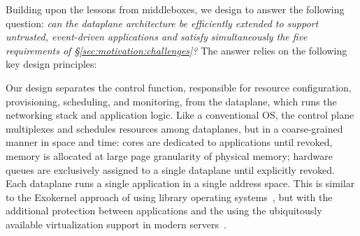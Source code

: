 
Building upon the lessons from middleboxes, we design \ix to answer
the following question: {\it can the dataplane architecture be
  efficiently extended to support untrusted, event-driven applications
  and satisfy simultaneously the five requirements of
  \S\ref{sec:motivation:challenges}?}  The answer relies on the
following key design principles:


Our design separates the control function, responsible for resource
configuration, provisioning, scheduling, and monitoring, from the
dataplane, which runs the networking stack and application logic.
Like a conventional OS, the control plane multiplexes and schedules
resources among dataplanes, but in a coarse-grained manner in space and
time: cores are dedicated to applications until revoked, memory is
allocated at large page granularity of physical memory; hardware queues are
exclusively assigned to a single dataplane until explicitly revoked.
Each dataplane runs a single application in a single address space.
This is similar to the Exokernel approach of using library operating
systems~\cite{DBLP:conf/sosp/EnglerKO95}, but with the additional
protection between applications and the  using the
ubiquitously available virtualization support in modern
servers~\cite{DBLP:journals/computer/UhligNRSMABKLS05,belay2012dune}.


